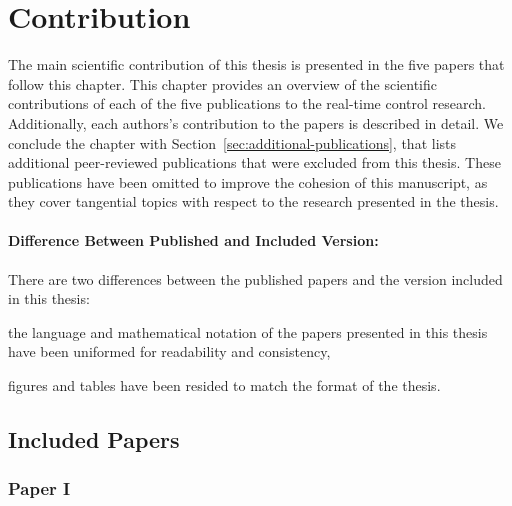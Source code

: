 \chapter{Contribution}%
\label{ch:contribution}%
%

The main scientific contribution of this thesis is presented in the five papers that follow this chapter.
This chapter provides an overview of the scientific contributions of each of the five publications to the real-time control research.
Additionally, each authors's contribution to the papers is described in detail.
We conclude the chapter with Section~\ref{sec:additional-publications}, that lists additional peer-reviewed publications that were excluded from this thesis.
These publications have been omitted to improve the cohesion of this manuscript, as they cover tangential topics with respect to the research presented in the thesis.

\subsubsection*{Difference Between Published and Included Version:}%
There are two differences between the published papers and the version included in this thesis:
\begin{enumerate*}[label=(\roman*)]
\item the language and mathematical notation of the papers presented in this thesis have been uniformed for readability and consistency,
\item figures and tables have been resided to match the format of the thesis.
\end{enumerate*}


\section{Included Papers}%
\label{sec:paper-summaries}%
%
\subsection*{Paper I}%
%
\begin{quote}
\end{quote}

